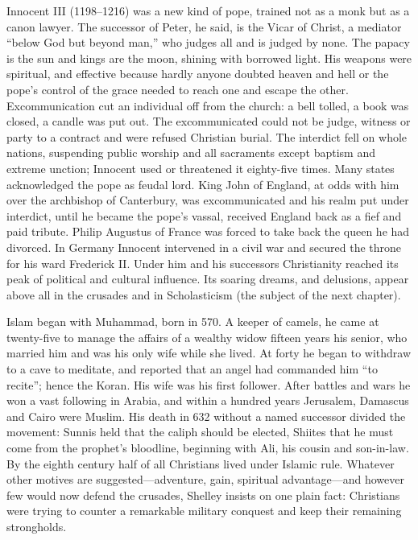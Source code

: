 Innocent III (1198--1216) was a new kind of pope, trained not as a monk but as a canon lawyer. The
successor of Peter, he said, is the Vicar of Christ, a mediator ``below God but beyond man,'' who
judges all and is judged by none. The papacy is the sun and kings are the moon, shining with borrowed
light. His weapons were spiritual, and effective because hardly anyone doubted heaven and hell or the pope's control of the grace needed to reach one and escape the other. Excommunication cut
an individual off from the church: a bell tolled, a book was closed, a candle was put out. The
excommunicated could not be judge, witness or party to a contract and were refused Christian burial.
The interdict fell on whole nations, suspending public worship and all sacraments except baptism and
extreme unction; Innocent used or threatened it eighty-five times. Many states acknowledged the pope
as feudal lord. King John of England, at odds with him over the archbishop of Canterbury, was
excommunicated and his realm put under interdict, until he became the pope's vassal, received England
back as a fief and paid tribute. Philip Augustus of France was forced to take back the queen he had
divorced. In Germany Innocent intervened in a civil war and secured the throne for his ward Frederick
II. Under him and his successors Christianity reached its peak of political and cultural influence.
Its soaring dreams, and delusions, appear above all in the crusades and in Scholasticism (the subject
of the next chapter).

Islam began with Muhammad, born in 570. A keeper of camels, he came at twenty-five to manage the
affairs of a wealthy widow fifteen years his senior, who married him and was his only wife while she
lived. At forty he began to withdraw to a cave to meditate, and reported that an angel had commanded
him ``to recite''; hence the Koran. His wife was his first follower. After battles and wars he won a
vast following in Arabia, and within a hundred years Jerusalem, Damascus and Cairo were Muslim. His
death in 632 without a named successor divided the movement: Sunnis held that the caliph should be
elected, Shiites that he must come from the prophet's bloodline, beginning with Ali, his cousin and
son-in-law. By the eighth century half of all Christians lived under Islamic rule. Whatever other
motives are suggested---adventure, gain, spiritual advantage---and however few would now defend
the crusades, Shelley insists on one plain fact: Christians were trying to counter a remarkable
military conquest and keep their remaining strongholds.

